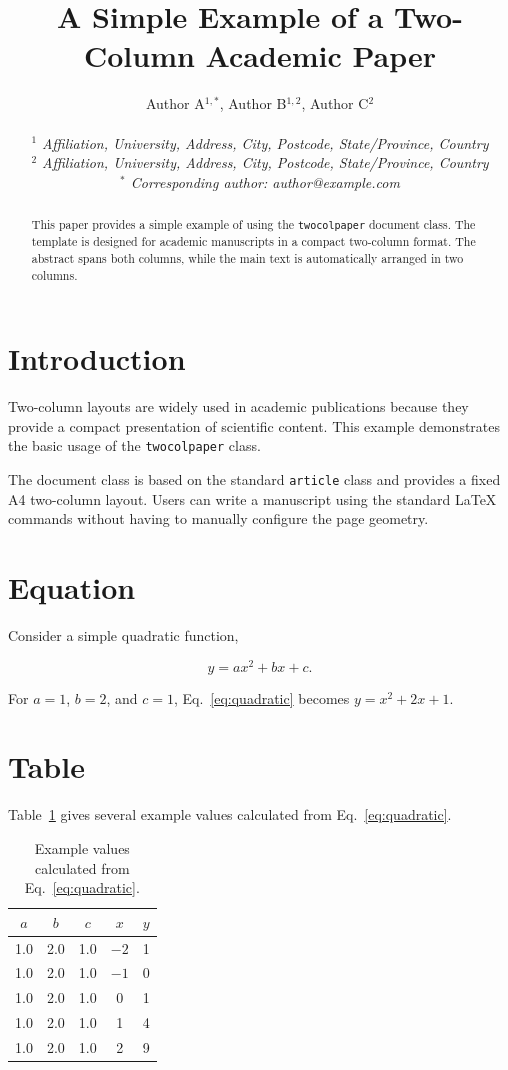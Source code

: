 \documentclass{../class/twocolpaper}
\title{A Simple Example of a Two-Column Academic Paper}
\author{
    Author A$^{1,*}$, Author B$^{1,2}$, Author C$^{2}$
    \\
    \small
    \parbox{0.95\linewidth}{
        \centering
        $^{1}$ \itshape Affiliation, University, Address, City, Postcode, State/Province, Country
        \\
        $^{2}$ \itshape Affiliation, University, Address, City, Postcode, State/Province, Country
        \\
        $^{*}$ Corresponding author: author@example.com
    }
}
\date{}
\begin{document}
\maketitle

\begin{abstract}
This paper provides a simple example of using the
\texttt{twocolpaper} document class. The template is designed
for academic manuscripts in a compact two-column format.
The abstract spans both columns, while the main text is
automatically arranged in two columns.
\end{abstract}

\section{Introduction}

Two-column layouts are widely used in academic publications
because they provide a compact presentation of scientific
content. This example demonstrates the basic usage of the
\texttt{twocolpaper} class.

The document class is based on the standard \texttt{article}
class and provides a fixed A4 two-column layout. Users can
write a manuscript using the standard \LaTeX{} commands without
having to manually configure the page geometry.

\section{Equation}

Consider a simple quadratic function,

\begin{equation}
    y = ax^2 + bx + c.
    \label{eq:quadratic}
\end{equation}

For $a=1$, $b=2$, and $c=1$, Eq.~\ref{eq:quadratic} becomes
$y=x^2+2x+1$.

\section{Table}

Table~\ref{tab:example} gives several example values calculated
from Eq.~\ref{eq:quadratic}.

\begin{table}[htbp]
    \centering
    \caption{Example values calculated from Eq.~\ref{eq:quadratic}.}
    \label{tab:example}
    \begin{tabular}{ccccc}
        \toprule
        $a$ & $b$ & $c$ & $x$ & $y$ \\
        \midrule
        1.0 & 2.0 & 1.0 & $-2$ & 1 \\
        1.0 & 2.0 & 1.0 & $-1$ & 0 \\
        1.0 & 2.0 & 1.0 & 0   & 1 \\
        1.0 & 2.0 & 1.0 & 1   & 4 \\
        1.0 & 2.0 & 1.0 & 2   & 9 \\
        \bottomrule
    \end{tabular}
\end{table}
\end{document}

